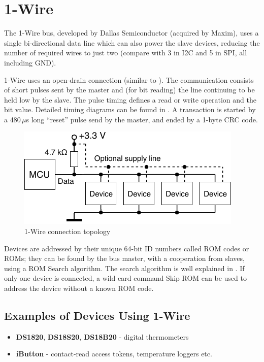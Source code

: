 \section{1-Wire} \label{sec:theory-1wire}

The 1-Wire bus, developed by Dallas Semiconductor (acquired by Maxim), uses a single bi-directional data line which can also power the slave devices, reducing the number of required wires to just two (compare with 3 in \gls{I2C} and 5 in \gls{SPI}, all including \gls{GND}).

1-Wire uses an open-drain connection (similar to \IIC). The communication consists of short pulses sent by the master and (for bit reading) the line continuing to be held low by the slave. The pulse timing defines a read or write operation and the bit value. Detailed timing diagrams can be found in \cite{ow-datasheet}. A transaction is started by a 480\,$\mu$s long ``reset'' pulse send by the master, and ended by a 1-byte \gls{CRC} code.

\begin{figure}[h]
	\centering
	\includegraphics[scale=1] {img/1w-connection.pdf}
	\caption{\label{fig:1w-topology}1-Wire connection topology}
\end{figure}

Devices are addressed by their unique 64-bit ID numbers called ROM codes or ROMs; they can be found by the bus master, with a cooperation from slaves, using a ROM Search algorithm. The search algorithm is well explained in \cite{ow-appnote}. If only one device is connected, a wild card command Skip ROM can be used to address the device without a known ROM code.

\subsection{Examples of Devices Using 1-Wire}

\begin{itemize}
	\item \textbf{DS1820}, \textbf{DS18S20}, \textbf{DS18B20} - digital thermometers
	\item \textbf{iButton} - contact-read access tokens, temperature loggers etc.
\end{itemize}

